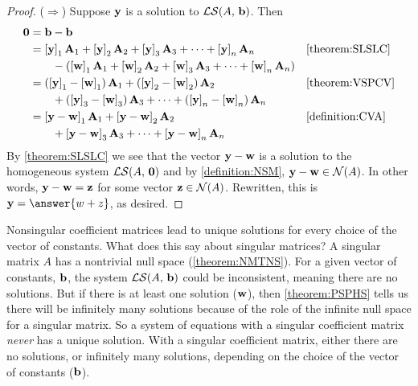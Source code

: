 \documentclass{ximera}
\begin{document}
\begin{theorem}
\begin{proof}
    ($\Rightarrow$) Suppose $\mathbf{y}$ is a solution to
    $\mathcal{LS}\!\left(A,\,\mathbf{b}\right)$.  Then
    \begin{align*}
      \mathbf{0}
      &=
        \mathbf{b}-\mathbf{b}&&\text{}\\
      &=
        \left\lbrack\mathbf{y}\right\rbrack_{1}\mathbf{A}_1+
        \left\lbrack\mathbf{y}\right\rbrack_{2}\mathbf{A}_2+
        \left\lbrack\mathbf{y}\right\rbrack_{3}\mathbf{A}_3+
        \cdots+
        \left\lbrack\mathbf{y}\right\rbrack_{n}\mathbf{A}_n
                         &&\ref{theorem:SLSLC}\\
      &\quad\quad
        -
        \left(
        \left\lbrack\mathbf{w}\right\rbrack_{1}\mathbf{A}_1+
        \left\lbrack\mathbf{w}\right\rbrack_{2}\mathbf{A}_2+
        \left\lbrack\mathbf{w}\right\rbrack_{3}\mathbf{A}_3+
        \cdots+
        \left\lbrack\mathbf{w}\right\rbrack_{n}\mathbf{A}_n
        \right)\\
      &=
        \left(\left\lbrack\mathbf{y}\right\rbrack_{1}-\left\lbrack\mathbf{w}\right\rbrack_{1}\right)\mathbf{A}_1+
        \left(\left\lbrack\mathbf{y}\right\rbrack_{2}-\left\lbrack\mathbf{w}\right\rbrack_{2}\right)\mathbf{A}_2
                         &&\ref{theorem:VSPCV}\\
      &\quad\quad
        +
        \left(\left\lbrack\mathbf{y}\right\rbrack_{3}-\left\lbrack\mathbf{w}\right\rbrack_{3}\right)\mathbf{A}_3+
        \cdots+
        \left(\left\lbrack\mathbf{y}\right\rbrack_{n}-\left\lbrack\mathbf{w}\right\rbrack_{n}\right)\mathbf{A}_n\\
      &=
        \left\lbrack\mathbf{y}-\mathbf{w}\right\rbrack_{1}\mathbf{A}_1+
        \left\lbrack\mathbf{y}-\mathbf{w}\right\rbrack_{2}\mathbf{A}_2
                         &&\ref{definition:CVA}\\
      &\quad\quad
        +\left\lbrack\mathbf{y}-\mathbf{w}\right\rbrack_{3}\mathbf{A}_3+
        \cdots+
        \left\lbrack\mathbf{y}-\mathbf{w}\right\rbrack_{n}\mathbf{A}_n
    \end{align*}
    By \ref{theorem:SLSLC} we see that the vector $\mathbf{y}-\mathbf{w}$
    is a solution to the homogeneous system $\mathcal{LS}\!\left(A,\,\mathbf{0}\right)$ and by
    \ref{definition:NSM}, $\mathbf{y}-\mathbf{w}\in\mathcal{N}\!\left(A\right)$.  In other
    words, $\mathbf{y}-\mathbf{w}=\mathbf{z}$ for some vector
    $\mathbf{z}\in\mathcal{N}\!\left(A\right)$.  Rewritten, this is
    $\vect{y}=\answer{w+z}$, as desired.
  \end{proof}
\end{theorem}

Nonsingular coefficient matrices lead to unique solutions for every
choice of the vector of constants.  What does this say about singular
matrices?  A singular matrix $A$ has a nontrivial null space
(\ref{theorem:NMTNS}).  For a given vector of constants, $\mathbf{b}$,
the system $\mathcal{LS}\!\left(A,\,\mathbf{b}\right)$ could be inconsistent, meaning
there are no solutions.  But if there is at least one solution
($\mathbf{w}$), then \ref{theorem:PSPHS} tells us there will be
infinitely many solutions because of the role of the infinite null
space for a singular matrix.  So a system of equations with a singular
coefficient matrix \textit{never} has a unique solution.  With a
singular coefficient matrix, either there are no solutions, or
infinitely many solutions, depending on the choice of the vector of
constants ($\mathbf{b}$).
\end{document}
